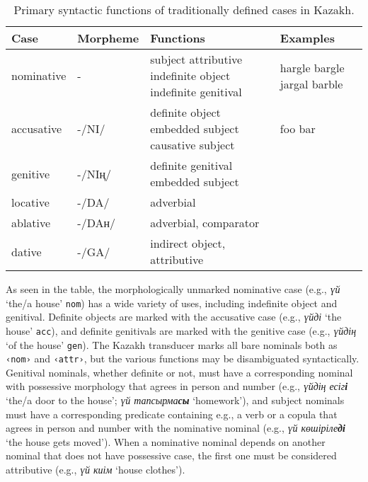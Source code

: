 \documentclass[a4paper,11pt, onecolumn,twoside]{article}
\newcommand{\gmk}[1]{{\rm {\sc \texttt{#1}}}}
\newcommand{\kazakh}[1]{{\em #1}}
\newcommand{\gloss}[1]{`#1'}
\newcommand{\tag}[1]{\texttt{‹#1›}}
\begin{document}
\begin{table}[htbp]
	\centering
	\caption{Primary syntactic functions of traditionally defined cases in Kazakh.}\label{tab:cases}
	\begin{small}
		\begin{tabular}{l p{5em} p{8em} p{22em}}
			\toprule
				\textbf{Case} & \textbf{Morpheme} & \textbf{Functions} & \textbf{Examples} \\
			\midrule
				nominative & - & subject\newline
										attributive\newline
										indefinite object\newline
										indefinite genitival 
									& hargle bargle \newline
										jargal barble \newline 
										\\
				accusative & -/NI/ & definite object\newline
											embedded subject\newline
											causative subject
										& foo \newline
											bar \\
				genitive & -/NIң/ & definite genitival\newline
											embedded subject \\
				locative & -/DA/ & adverbial
										& \\
				ablative & -/DAн/ & adverbial,\newline
											comparator \\
				dative & -/GA/ & indirect object,\newline
										attributive
									& \\
			\bottomrule
		\end{tabular}
	\end{small}
\end{table}

As seen in the table, the morphologically unmarked nominative case (e.g., \kazakh{үй} \gloss{the/a house} \gmk{nom}) has a wide variety of uses, including indefinite object and genitival.  Definite objects are marked with the accusative case (e.g., \kazakh{үйді} \gloss{the house} \gmk{acc}), and definite genitivals are marked with the genitive case (e.g., \kazakh{үйдің} \gloss{of the house} \gmk{gen}).  The Kazakh transducer marks all bare nominals both as \tag{nom} and \tag{attr}, but the various functions may be disambiguated syntactically.  Genitival nominals, whether definite or not, must have a corresponding nominal with possessive morphology that agrees in person and number (e.g., \kazakh{үйдің есіг\textbf{і}} \gloss{the/a door to the house}; \kazakh{үй тапсырма\textbf{сы}} \gloss{homework}), and subject nominals must have a corresponding predicate containing e.g., a verb or a copula that agrees in person and number with the nominative nominal (e.g., \kazakh{үй көшіріле\textbf{ді}} \gloss{the house gets moved}).  When a nominative nominal depends on another nominal that does not have possessive case, the first one must be considered attributive (e.g., \kazakh{үй киім} \gloss{house clothes}).
\end{document}
